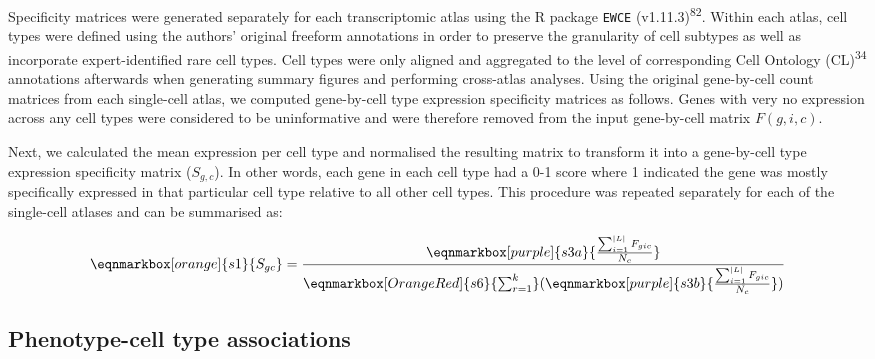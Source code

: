 \documentclass[
]{report}
\begin{document}
Specificity matrices were generated separately for each transcriptomic
atlas using the R package \texttt{EWCE} (v1.11.3)\textsuperscript{82}.
Within each atlas, cell types were defined using the authors' original
freeform annotations in order to preserve the granularity of cell
subtypes as well as incorporate expert-identified rare cell types. Cell
types were only aligned and aggregated to the level of corresponding
Cell Ontology (CL)\textsuperscript{34} annotations afterwards when
generating summary figures and performing cross-atlas analyses. Using
the original gene-by-cell count matrices from each single-cell atlas, we
computed gene-by-cell type expression specificity matrices as follows.
Genes with very no expression across any cell types were considered to
be uninformative and were therefore removed from the input gene-by-cell
matrix \(F(g,i,c)\).

Next, we calculated the mean expression per cell type and normalised the
resulting matrix to transform it into a gene-by-cell type expression
specificity matrix (\(S_{g,c}\)). In other words, each gene in each cell
type had a 0-1 score where 1 indicated the gene was mostly specifically
expressed in that particular cell type relative to all other cell types.
This procedure was repeated separately for each of the single-cell
atlases and can be summarised as:

\hfill\break

\begin{equation*}
  \eqnmarkbox[orange]{s1}{S_{gc}}
  =
  \frac{
    \eqnmarkbox[purple]{s3a}{
      \frac{
        \sum_{i=1}^{|L|} F_{gic}
      }{
        N_c  
      }
    } 
  }{
   \eqnmarkbox[OrangeRed]{s6}{\sum_{r=1}^{k}}(
     \eqnmarkbox[purple]{s3b}{
      \frac{
        \sum_{i=1}^{|L|} F_{gic}
      }{
        N_c  
      }
    } 
   ) 
  }
\end{equation*}

\hfill\break

\subsection{Phenotype-cell type
associations}\label{phenotype-cell-type-associations-1}
\end{document}

